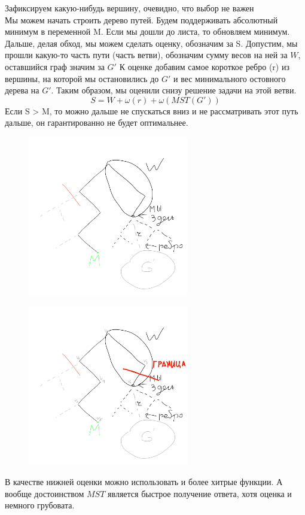 \documentclass[discrete.tex]{subfiles}
\begin{document}
    \begin{task}[решение ]
        Зафиксируем какую-нибудь вершину, очевидно, что выбор не важен\\
        Мы можем начать строить дерево путей. 
        Будем поддерживать абсолютный минимум в переменной M.
        Если мы дошли до листа, то обновляем минимум. Дальше, делая обход, 
        мы можем сделать оценку, обозначим за S.
        Допустим, мы прошли какую-то часть пути (часть ветви),
        обозначим 
        сумму весов на ней за $W$, оставшийся граф значим за $G'$
        К оценке добавим самое короткое ребро (r) из вершины, на которой 
        мы остановились до $G'$ и вес минимального остовного дерева на $G'$.
        Таким образом, мы оценили снизу решение задачи на этой ветви. 
        \[S = W + \omega(r) + \omega(MST(G'))\]
        Если S > M, то можно дальше не спускаться вниз и не рассматривать этот 
        путь дальше, он гарантированно не будет оптимальнее.
        \begin{figure}[H]
            \includegraphics[width=7cm]{pics/53_1.png}
            \centering
        \end{figure}
        \begin{figure}[H]
            \includegraphics[width=7cm]{pics/53_2.png}
            \centering
        \end{figure}
        
        В качестве нижней оценки можно использовать и более хитрые функции. А 
        вообще достоинством $MST$ является быстрое получение ответа, хотя оценка 
        и немного грубовата.
    \end{task}
    \newpage
\end{document}
